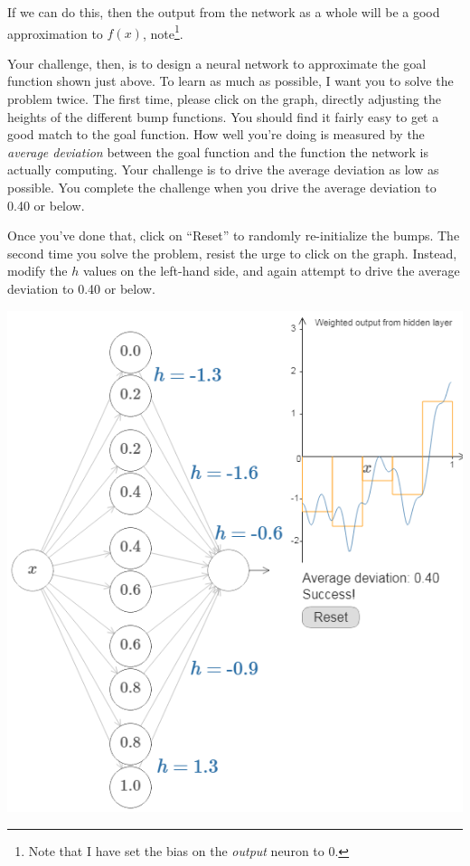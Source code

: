 If we can do this, then the output from the network as a whole will be a good approximation to $f(x)$, note\footnote{Note that I have set the bias on the \textit{output} neuron to 0.}.

Your challenge, then, is to design a neural network to approximate the goal function shown just above. To learn as much as possible, I want you to solve the problem twice. The first time, please click on the graph, directly adjusting the heights of the different bump functions. You should find it fairly easy to get a good match to the goal function. How well you're doing is measured by the \textit{average deviation} between the goal function and the function the network is actually computing. Your challenge is to drive the average deviation as low as possible. You complete the challenge when you drive the average deviation to 0.40 or below.

Once you've done that, click on ``Reset'' to randomly re-initialize the bumps. The second time you solve the problem, resist the urge to click on the graph. Instead, modify the $h$ values on the left-hand side, and again attempt to drive the average deviation to 0.40 or below.

{\centering \includegraphics[width=\textwidth,]{pic/wigglyfn19} \par}

